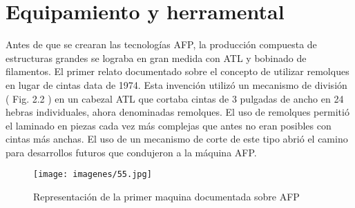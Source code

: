 \section{Equipamiento y herramental}
Antes de que se crearan las tecnologías AFP, la producción compuesta de estructuras grandes se lograba en gran medida con ATL y bobinado de filamentos. El primer relato documentado sobre el concepto de utilizar remolques en lugar de cintas data de 1974. Esta invención utilizó un mecanismo de división ( Fig. 2.2 ) en un cabezal ATL que cortaba cintas de 3 pulgadas de ancho en 24 hebras individuales, ahora denominadas remolques. El uso de remolques permitió el laminado en piezas cada vez más complejas que antes no eran posibles con cintas más anchas. El uso de un mecanismo de corte de este tipo abrió el camino para desarrollos futuros que condujeron a la máquina AFP.
\begin{figure}[H]
\begin{center}
\texttt{[image: imagenes/55.jpg]}
\caption{Representación de la primer maquina documentada sobre AFP}
\label{afp}
\end{center}
\end{figure}
 
